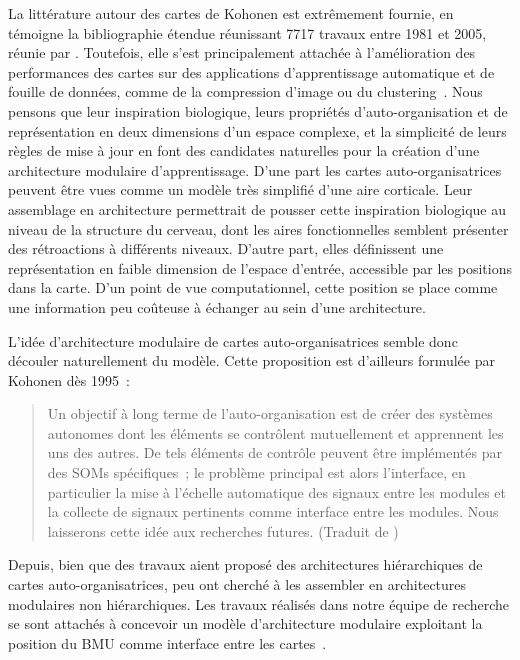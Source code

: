 La littérature autour des cartes de Kohonen est extrêmement fournie, en témoigne la bibliographie étendue réunissant 7717 travaux entre 1981 et 2005, réunie par \cite{Kaski1998BibliographyOS,oja_bibliography_2002,Honkela2009BIBLIOGRAPHYOS}.
Toutefois, elle s'est principalement attachée à l'amélioration des performances des cartes sur des applications d'apprentissage automatique et de fouille de données, comme de la compression d'image ou du clustering~\parencite{kohonen_essentials_2013}.
Nous pensons que leur inspiration biologique, leurs propriétés d'auto-organisation et de représentation en deux dimensions d'un espace complexe, et la simplicité de leurs règles de mise à jour en font des candidates naturelles pour la création d'une architecture modulaire d'apprentissage.
D'une part les cartes auto-organisatrices peuvent être vues comme un modèle très simplifié d'une aire corticale. Leur assemblage en architecture permettrait de pousser cette inspiration biologique au niveau de la structure du cerveau, dont les aires fonctionnelles semblent présenter des rétroactions à différents niveaux.
D'autre part, elles définissent une représentation en faible dimension de l'espace d'entrée, accessible par les positions dans la carte. D'un point de vue computationnel, cette position se place comme une information peu coûteuse à échanger au sein d'une architecture.

L'idée d'architecture modulaire de cartes auto-organisatrices semble donc découler naturellement du modèle. Cette proposition est d'ailleurs formulée par Kohonen dès 1995~:
\begin{quote}
\og Un objectif à long terme de l'auto-organisation est de créer des systèmes autonomes dont les éléments se contrôlent mutuellement et apprennent les uns des autres. De tels éléments de contrôle peuvent être implémentés par des SOMs spécifiques~; le problème principal est alors l'interface, en particulier la mise à l'échelle automatique des signaux entre les modules et la collecte de signaux pertinents comme interface entre les modules. Nous laisserons cette idée aux recherches futures. \fg{}
(Traduit de \cite{Kohonen1995SelfOrganizingM})
\end{quote}

Depuis, bien que des travaux aient proposé des architectures hiérarchiques de cartes auto-organisatrices, peu ont cherché à les assembler en architectures modulaires non hiérarchiques. 
Les travaux réalisés dans notre équipe de recherche se sont attachés à concevoir un modèle d'architecture modulaire exploitant la position du BMU comme interface entre les cartes~\parencite{baheux_towards_2014}.

